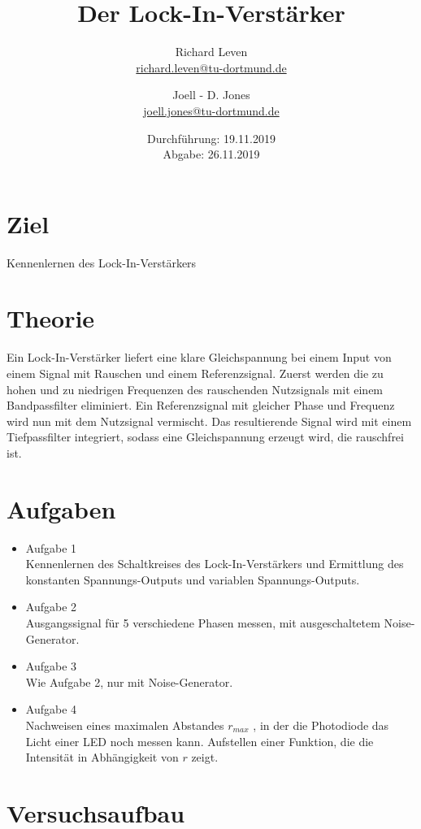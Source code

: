 \documentclass[captions=tableheading]{scrartcl}
\title{Der Lock-In-Verstärker}
\author{Richard Leven \\ \href{mailto:richard.leven@tu-dortmund.de}{richard.leven@tu-dortmund.de}
 \and Joell - D. Jones \\ \href{mailto:joell.jones@tu-dortmund.de}{joell.jones@tu-dortmund.de}}
\date{
    Durchführung: 19.11.2019\\
    Abgabe: 26.11.2019
}
\begin{document}
\maketitle
\newpage
\section{Ziel}
Kennenlernen des Lock-In-Verstärkers
\section{Theorie}
Ein Lock-In-Verstärker liefert eine klare Gleichspannung bei einem Input von einem Signal mit Rauschen und einem Referenzsignal.
Zuerst werden die zu hohen und zu niedrigen Frequenzen des rauschenden Nutzsignals mit einem Bandpassfilter eliminiert.
Ein Referenzsignal mit gleicher Phase und Frequenz wird nun mit dem Nutzsignal vermischt.
Das resultierende Signal wird mit einem Tiefpassfilter integriert, sodass eine Gleichspannung erzeugt wird, die rauschfrei ist.
\section{Aufgaben}
    \begin{itemize}
        \item{Aufgabe 1 \\}
        Kennenlernen des Schaltkreises des Lock-In-Verstärkers und Ermittlung des konstanten Spannungs-Outputs und variablen Spannungs-Outputs.
        \item{Aufgabe 2 \\}
        Ausgangssignal für 5 verschiedene Phasen messen, mit ausgeschaltetem Noise-Generator.
        \item{Aufgabe 3 \\}
        Wie Aufgabe 2, nur mit Noise-Generator.
        \item{Aufgabe 4 \\}
        Nachweisen eines maximalen Abstandes \(r_{max}\) , in der die Photodiode das Licht einer LED noch messen kann.
        Aufstellen einer Funktion, die die Intensität in Abhängigkeit von \(r\) zeigt.
    \end{itemize}
\section{Versuchsaufbau}

\begin{figure}

\end{figure}
\newpage
\end{document}
